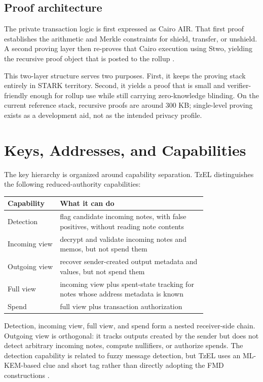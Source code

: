 \documentclass[11pt]{article}
\newcommand{\TzEL}{TzEL}
\begin{document}
\subsection{Proof architecture}

The private transaction logic is first expressed as Cairo AIR. That first proof
establishes the arithmetic and Merkle constraints for shield, transfer, or
unshield. A second proving layer then re-proves that Cairo execution using
Stwo, yielding the recursive proof object that is posted to the rollup
\cite{cairo,stark,circle-starks,stwo}.

This two-layer structure serves two purposes. First, it keeps the proving stack
entirely in STARK territory. Second, it yields a proof that is small and
verifier-friendly enough for rollup use while still carrying zero-knowledge
blinding. On the current reference stack, recursive proofs are around 300 KB;
single-level proving exists as a development aid, not as the intended privacy
profile.

\section{Keys, Addresses, and Capabilities}

The key hierarchy is organized around capability separation. \TzEL{}
distinguishes the following reduced-authority capabilities:

\begin{center}
\begin{tabular}{>{\raggedright\arraybackslash}p{0.18\linewidth} >{\raggedright\arraybackslash}p{0.60\linewidth}}
\toprule
Capability & What it can do \\
\midrule
Detection & flag candidate incoming notes, with false positives, without reading note contents \\
Incoming view & decrypt and validate incoming notes and memos, but not spend them \\
Outgoing view & recover sender-created output metadata and values, but not spend them \\
Full view & incoming view plus spent-state tracking for notes whose address metadata is known \\
Spend & full view plus transaction authorization \\
\bottomrule
\end{tabular}
\end{center}

Detection, incoming view, full view, and spend form a nested receiver-side
chain. Outgoing view is orthogonal: it tracks outputs created by the sender but
does not detect arbitrary incoming notes, compute nullifiers, or authorize
spends. The detection capability is related to fuzzy message detection, but
\TzEL{} uses an ML-KEM-based clue and short tag rather than directly adopting
the FMD constructions \cite{fmd}.
\end{document}
